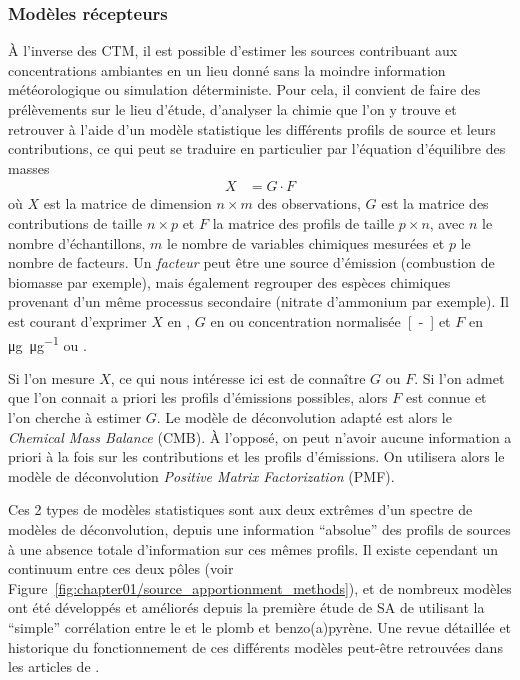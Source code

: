 \subsubsection{Modèles récepteurs}%
\label{ssub:model_recepteur}

À l'inverse des CTM, il est possible d'estimer les sources contribuant aux concentrations
ambiantes en un lieu donné sans la moindre information météorologique ou simulation
déterministe. Pour cela, il convient de faire des prélèvements sur le lieu d'étude,
d'analyser la chimie que l'on y trouve et retrouver à l'aide d'un modèle statistique
les différents profils de source et leurs contributions, ce qui peut se traduire en
particulier par l'équation d'équilibre des masses
\begin{align}
    \label{eq:mass_balance}
    X &= G \cdot F
\end{align}
où $X$ est la matrice de dimension $n\times m$ des observations, $G$ est la matrice des
contributions de taille $n\times p$ et $F$ la matrice des profils de taille $p \times n$,
avec $n$ le nombre d'échantillons, $m$ le nombre de variables chimiques mesurées et $p$ le
nombre de facteurs.
Un \textit{facteur} peut être une source d'émission (combustion de biomasse par exemple),
mais également regrouper des espèces chimiques provenant d'un même processus secondaire
(nitrate d'ammonium par exemple).
Il est courant d'exprimer $X$ en \si{\ugm}, $G$ en \si{\ugm} ou concentration
normalisée~\si{[-]} et $F$ en \si{\micro\g\per\micro\g} ou \si{\ugm}.

Si l'on mesure $X$, ce qui nous intéresse ici est de connaître $G$ ou $F$.
Si l'on admet que l'on connait a priori les profils d'émissions possibles, alors $F$ est
connue et l'on cherche à estimer $G$. Le modèle de déconvolution adapté est alors le
\textit{Chemical Mass Balance} (CMB). À l'opposé, on peut n'avoir aucune information a
priori à la fois sur les contributions et les profils d'émissions. On utilisera alors le
modèle de déconvolution \textit{Positive Matrix Factorization} (PMF).

Ces 2 types de modèles statistiques sont aux deux extrêmes d'un spectre de modèles de
déconvolution, depuis une information ``absolue'' des profils de sources à une absence
totale d'information sur ces mêmes profils.  Il existe cependant un continuum entre ces
deux pôles (voir Figure~\ref{fig:chapter01/source_apportionment_methods}), et de nombreux
modèles ont été développés et améliorés depuis la première étude de SA de
\cite{colucciAutomotive1965} utilisant la ``simple'' corrélation entre le  et
le plomb et benzo(a)pyrène.  Une revue détaillée et historique du fonctionnement de ces
différents modèles peut-être retrouvées dans les articles de
\cite{henryHistory1997,vianaSource2008,belisCritical2013,hopkeReview2016}.

